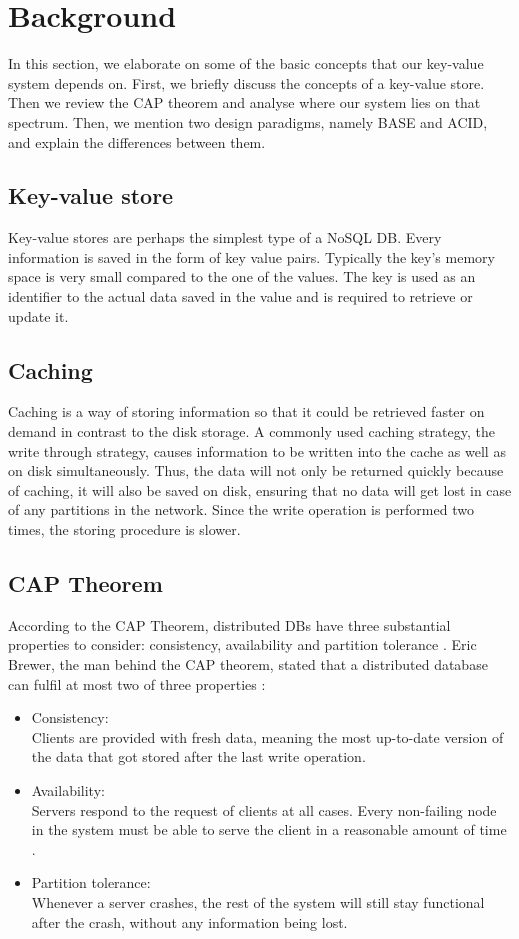 \section{Background}
\label{sec:background}
In this section, we elaborate on some of the basic concepts that our key-value system depends on. First, we briefly discuss the concepts of a key-value store. Then we review the CAP theorem and analyse where our system lies on that spectrum. Then, we mention two design paradigms, namely BASE and ACID, and explain the differences between them.

\subsection{Key-value store}
Key-value stores are perhaps the simplest type of a NoSQL DB. Every information is saved in the form of key value pairs. Typically the key’s memory space is very small compared to the one of the values. The key is used as an identifier to the actual data saved in the value and is required to retrieve or update it.

\subsection{Caching}
\label{sec:caching}
Caching is a way of storing information so that it could be retrieved faster on demand in contrast to the disk storage. A commonly used caching strategy, the write through strategy, causes information to be written into the cache as well as on disk simultaneously. Thus, the data will not only be returned quickly because of caching, it will also be saved on disk, ensuring that no data will get lost in case of any partitions in the network. Since the write operation is performed two times, the storing procedure is slower.

\subsection{CAP Theorem}
\label{sec:background_cap} 
According to the CAP Theorem, distributed DBs have three substantial properties to consider: consistency, availability and partition tolerance \cite{brewer2012cap}. Eric Brewer, the man behind the CAP theorem, stated that a distributed database can fulfil at most two of three properties \cite{brewer2000cap}:

\begin{itemize}
  \item Consistency: \\
  Clients are provided with fresh data, meaning the most up-to-date version of the data that got stored after the last write operation.
  \item Availability: \\
  Servers respond to the request of clients at all cases. Every non-failing node in the system must be able to serve the client in a reasonable amount of time \cite{gilbert2002brewer}.
  \item Partition tolerance: \\
  Whenever a server crashes, the rest of the system will still stay functional after the crash, without any information being lost.
\end{itemize}

